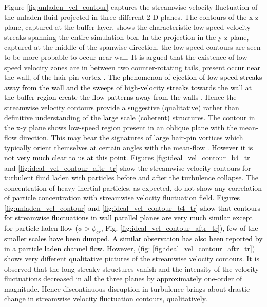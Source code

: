 \documentclass[aip,graphicx]{revtex4-1}
\begin{document}
Figure \ref{fig:unladen_vel_contour} captures the streamwise velocity fluctuation of the unladen fluid projected in three different 2-D planes. The contours of the x-z plane, captured at the buffer layer, shows the characteristic low-speed velocity streaks spanning the entire simulation box. In the projection in the y-z plane, captured at the middle of the spanwise direction, the low-speed contours are seen to be more probable to occur near wall. It is argued that the existence of low-speed velocity zones are in between two counter-rotating tails, present occur near the wall, of the hair-pin vortex \citep*{Hinze, head1981new, dennis2015coherent}. \textcolor{black}{The phenomenon of ejection of low-speed streaks away from the wall and the sweeps of high-velocity streaks towards the wall at the buffer region create the flow-patterns away from the walls \citep{kline1967structure, Hinze, dennis2015coherent}}. Hence the streamwise velocity contours provide a suggestive (qualitative) rather than definitive understanding of the \textcolor{black}{large scale (coherent)} structures. The contour in the x-y plane shows low-speed region present in an oblique plane with the mean-flow direction. This may bear the signatures of large hair-pin vortices which typically orient themselves at certain angles with the mean-flow \citep{Hinze, head1981new, dennis2015coherent}. \textcolor{black}{However it is not very much clear to us at this point}. Figures \ref{fig:ideal_vel_contour_b4_tr} and \ref{fig:ideal_vel_contour_aftr_tr} show the streamwise velocity contours for turbulent fluid laden with particles before and after \textcolor{black}{the turbulence collapse}. The concentration of heavy inertial particles, as expected, do not show any correlation \textcolor{black}{of particle concentration} with streamwise velocity fluctuation field. 
\textcolor{black}{Figures \ref{fig:unladen_vel_contour} and \ref{fig:ideal_vel_contour_b4_tr} show that contours for streamwise fluctuations in wall parallel planes are very much similar except for particle laden flow ($\phi>\phi_{cr}$, Fig. \ref{fig:ideal_vel_contour_aftr_tr}), few of the smaller scales have been dumped. A similar observation has also been reported by \citet{zhao2010turbulence} in a particle laden channel flow.}
However, (fig: \ref{fig:ideal_vel_contour_aftr_tr}) shows very different qualitative pictures of the streamwise velocity contours. It is observed that the long streaky structures vanish and the intensity of the velocity fluctuations decreased in all the three planes by \textcolor{black}{approximately} one-order of magnitude. Hence discontinuous disruption in turbulence brings about drastic change in streamwise velocity fluctuation contours, qualitatively.
\end{document}

